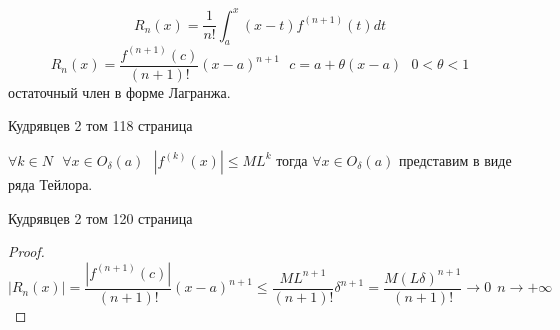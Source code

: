 \begin{define}
  $$
  R_n(x) = \frac{1}{n!} \int_a^x (x - t) f^{(n+1)}(t)dt
  $$
  $$
  R_n(x) = \frac{f^{(n+1)}(c)}{(n+1)!} (x - a)^{n+1} ~~~
  c = a + \theta(x-a) ~~~ 0 < \theta < 1
  $$
  остаточный член в форме Лагранжа.

  Кудрявцев 2 том 118 страница
\end{define}

\begin{theorem}
  $\forall k \in N ~~~ \forall x \in O_{\delta}(a) ~~~ |f^{(k)}(x)| \le M L^k$
  тогда $\forall x \in O_{\delta}(a)$ представим в виде ряда Тейлора.

  Кудрявцев 2 том 120 страница
\end{theorem}

\begin{proof}
  $$
  |R_n(x)| = \frac{| f^{(n+1)}(c) |}{(n+1)!} (x-a)^{n+1} \le
  \frac{ML^{n+1}}{(n+1)!} \delta^{n+1} =
  \frac{ M (L\delta)^{n+1} }{(n+1)!} \to 0 ~~ n \to +\infty
  $$
\end{proof}